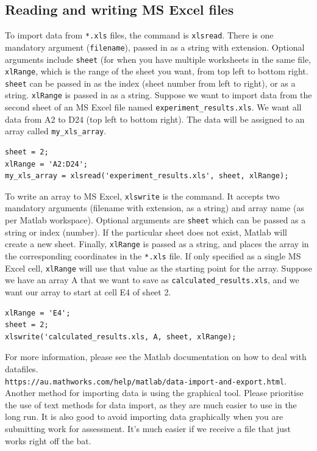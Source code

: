 \documentclass[12pt]{article}
\begin{document}
\subsection{Reading and writing MS Excel files}
To import data from \texttt{*.xls} files, the command is \texttt{xlsread}. There is one mandatory argument (\texttt{filename}), passed in as a string with extension. Optional arguments include \texttt{sheet} (for when you have multiple worksheets in the same file, \texttt{xlRange}, which is the range of the sheet you want, from top left to bottom right. \texttt{sheet} can be passed in as the index (sheet number from left to right), or as a string. \texttt{xlRange} is passed in as a string. Suppose we want to import data from the second sheet of an MS Excel file named \texttt{experiment\_results.xls}. We want all data from A2 to D24 (top left to bottom right). The data will be assigned to an array called \texttt{my\_xls\_array}.
\begin{lstlisting}
sheet = 2;
xlRange = 'A2:D24';
my_xls_array = xlsread('experiment_results.xls', sheet, xlRange); 
\end{lstlisting}

To write an array to MS Excel, \texttt{xlswrite} is the command. It accepts two mandatory arguments (filename with extension, as a string) and array name (as per Matlab workspace). Optional arguments are \texttt{sheet} which can be passed as a string or index (number). If the particular sheet does not exist, Matlab will create a new sheet. Finally, \texttt{xlRange} is passed as a string, and places the array in the corresponding coordinates in the \texttt{*.xls} file. If only specified as a single MS Excel cell, \texttt{xlRange} will use that value as the starting point for the array. Suppose we have an array A that we want to save as \texttt{calculated\_results.xls}, and we want our array to start at cell E4 of sheet 2.
\begin{lstlisting}
xlRange = 'E4';
sheet = 2;
xlswrite('calculated_results.xls, A, sheet, xlRange);
\end{lstlisting}

For more information, please see the Matlab documentation on how to deal with datafiles. \\
\texttt{https://au.mathworks.com/help/matlab/data-import-and-export.html}. Another method for importing data is using the graphical tool. Please prioritise the use of text methods for data import, as they are much easier to use in the long run. It is also good to avoid importing data graphically when you are submitting work for assessment. It's much easier if we receive a file that just works right off the bat. 
\end{document}
